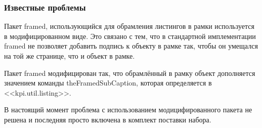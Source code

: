 \subsubsection{Известные проблемы}
Пакет framed, использующийся для обрамления листингов в рамки используется в модифицированном виде. Это связано с тем, что в стандартной имплементации framed не позволяет добавить подпись к объекту в рамке так, чтобы он умещался на той же странице, что и объект в рамке.\par
Пакет framed модифицирован так, что обрамлённый в рамку объект дополняется значением команды theFramedSubCaption, которая определяется в <<kpi.util.listing>>.\par
В настоящий момент проблема с использованием модицифированного пакета не решена и последняя просто включена в комплект поставки набора.

